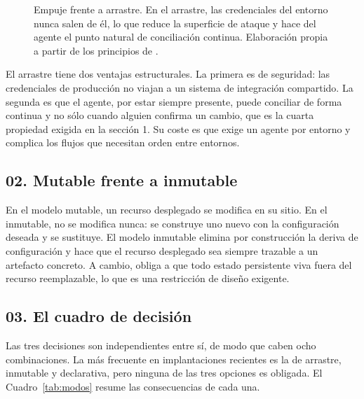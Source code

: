 \documentclass[11pt,letterpaper]{article}
\begin{document}
\begin{figure}[ht]
  \caption{Empuje frente a arrastre. En el arrastre, las credenciales del
  entorno nunca salen de él, lo que reduce la superficie de ataque y hace del
  agente el punto natural de conciliación continua. Elaboración propia a
  partir de los principios de \textcite{opengitops}.}
  \label{fig:pushpull}
\end{figure}

El arrastre tiene dos ventajas estructurales. La primera es de seguridad: las
credenciales de producción no viajan a un sistema de integración compartido.
La segunda es que el agente, por estar siempre presente, puede conciliar de
forma continua y no sólo cuando alguien confirma un cambio, que es la cuarta
propiedad exigida en la sección 1. Su coste es que exige un agente por
entorno y complica los flujos que necesitan orden entre entornos.

\subsection*{02. Mutable frente a inmutable}

En el modelo mutable, un recurso desplegado se modifica en su sitio. En el
inmutable, no se modifica nunca: se construye uno nuevo con la configuración
deseada y se sustituye. El modelo inmutable elimina por construcción la deriva
de configuración y hace que el recurso desplegado sea siempre trazable a un
artefacto concreto. A cambio, obliga a que todo estado persistente viva fuera
del recurso reemplazable, lo que es una restricción de diseño exigente.

\subsection*{03. El cuadro de decisión}

Las tres decisiones son independientes entre sí, de modo que caben ocho
combinaciones. La más frecuente en implantaciones recientes es la de arrastre,
inmutable y declarativa, pero ninguna de las tres opciones es obligada. El
Cuadro~\ref{tab:modos} resume las consecuencias de cada una.
\end{document}
